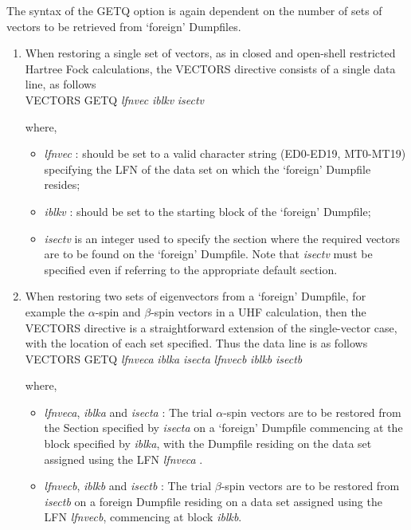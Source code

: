 \documentclass[11pt,fleqn]{article}
\begin{document}
The syntax of the GETQ option is again dependent on the number of
sets of vectors to be retrieved from `foreign' Dumpfiles.
\begin{enumerate}
 \item When restoring a single set of vectors, as in closed and open-shell
restricted Hartree Fock calculations, the VECTORS directive
consists of a single data line, as follows\\

 VECTORS GETQ {\em lfnvec}  {\em iblkv} {\em isectv}

where,

\begin{itemize}
\item {\em lfnvec} : should be set to a valid character string (ED0-ED19,
MT0-MT19) specifying the LFN of the data set on which the `foreign'
Dumpfile resides;
\item {\em iblkv} : should be set to the starting block of the `foreign'
Dumpfile;
\item {\em isectv} is an integer used to specify the section where the
required vectors are to be found on the `foreign' Dumpfile. Note that
{\em isectv} must be specified even if referring to the appropriate
default section.
\end{itemize}


\item When restoring two sets of eigenvectors from a `foreign' Dumpfile,
for example the $\alpha$-spin and $\beta$-spin vectors in a UHF
calculation, then the VECTORS directive is a straightforward extension
of the single-vector case, with the location of each set specified. Thus
the data line is as follows\\

VECTORS GETQ {\em lfnveca}  {\em iblka} {\em isecta} {\em lfnvecb} {\em iblkb} {\em isectb}

where,\\
\begin{itemize}
\item {\em lfnveca}, {\em iblka} and {\em isecta} : The trial
$\alpha$-spin vectors are to be restored
from the Section specified by {\em isecta}  on a `foreign' Dumpfile commencing
at the block specified by {\em iblka}, with the Dumpfile residing on the
data set assigned using the LFN {\em lfnveca} .

\item {\em lfnvecb}, {\em iblkb} and {\em isectb} : The trial
$\beta$-spin vectors are to be restored
from {\em isectb}  on a foreign Dumpfile residing on a data set
assigned using the LFN {\em lfnvecb}, commencing at block {\em iblkb}.
\end{itemize}


\end{enumerate}
\end{document}
